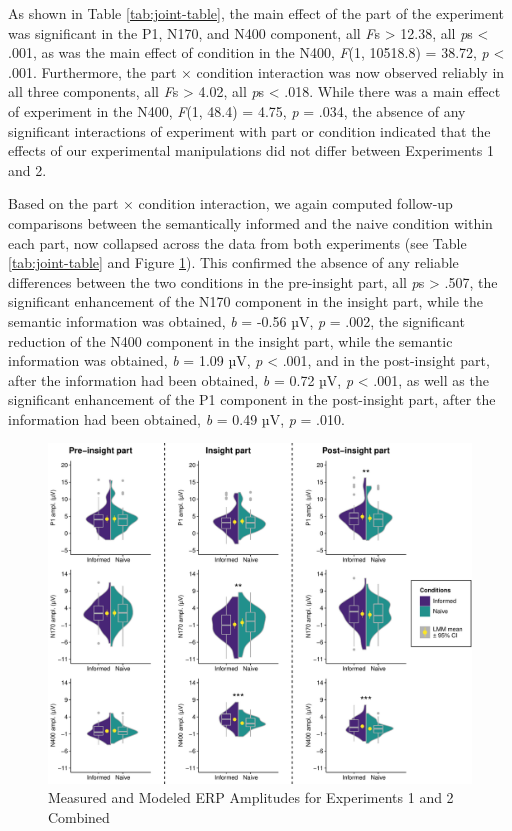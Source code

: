 \documentclass[
  english,
  doc,12pt,twoside,floatsintext]{apa7}
\begin{document}
As shown in Table \ref{tab:joint-table}, the main effect of the part of the experiment was significant in the P1, N170, and N400 component, all \emph{F}s \textgreater{} 12.38, all \emph{p}s \textless{} .001, as was the main effect of condition in the N400, \emph{F}(1, 10518.8) = 38.72, \emph{p} \textless{} .001. Furthermore, the part × condition interaction was now observed reliably in all three components, all \emph{F}s \textgreater{} 4.02, all \emph{p}s \textless{} .018. While there was a main effect of experiment in the N400, \emph{F}(1, 48.4) = 4.75, \emph{p} = .034, the absence of any significant interactions of experiment with part or condition indicated that the effects of our experimental manipulations did not differ between Experiments 1 and 2.

Based on the part × condition interaction, we again computed follow-up comparisons between the semantically informed and the naive condition within each part, now collapsed across the data from both experiments (see Table \ref{tab:joint-table} and Figure \ref{fig:joint-plot}). This confirmed the absence of any reliable differences between the two conditions in the pre-insight part, all \emph{p}s \textgreater{} .507, the significant enhancement of the N170 component in the insight part, while the semantic information was obtained, \emph{b} = -0.56 µV, \emph{p} = .002, the significant reduction of the N400 component in the insight part, while the semantic information was obtained, \emph{b} = 1.09 µV, \emph{p} \textless{} .001, and in the post-insight part, after the information had been obtained, \emph{b} = 0.72 µV, \emph{p} \textless{} .001, as well as the significant enhancement of the P1 component in the post-insight part, after the information had been obtained, \emph{b} = 0.49 µV, \emph{p} = .010.



\begin{figure}

{\centering \includegraphics[width=1\linewidth]{master_thesis_files/figure-latex/joint-plot-1} 

}

\caption{Measured and Modeled ERP Amplitudes for Experiments 1 and 2 Combined\smallskip}\label{fig:joint-plot}
\end{figure}
\end{document}
